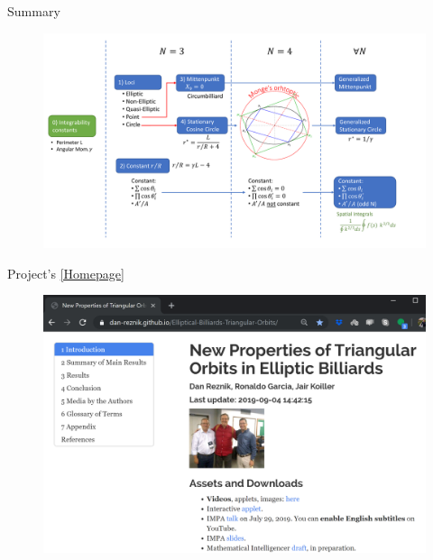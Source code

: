 \begin{frame}{Summary}
\begin{figure}
    \includegraphics[clip,trim={0 0 0 0},height=.9\textheight]{pics/0002_diagram_slide.pdf}
\end{figure}
\end{frame}

\begin{frame}{Project's \href{https://dan-reznik.github.io/Elliptical-Billiards-Triangular-Orbits/}{[Homepage]}}
\begin{figure}
    \includegraphics[height=.8\textheight]{pics/0000_website.png}
\end{figure}

\end{frame}

